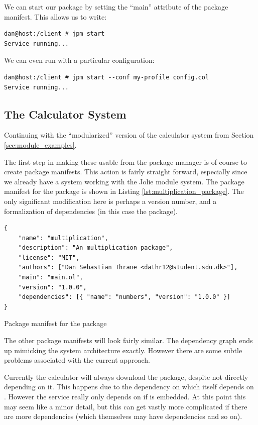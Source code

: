 We can start our package by setting the ``main'' attribute of the package
manifest. This allows us to write:

\begin{verbatim}
dan@host:/client # jpm start
Service running...
\end{verbatim}

We can even run with a particular configuration:

\begin{verbatim}
dan@host:/client # jpm start --conf my-profile config.col
Service running...
\end{verbatim}

\subsection{The Calculator System}
\label{sec:calculator_packages}

Continuing with the ``modularized'' version of the calculator system from
Section \ref{sec:module_examples}.

The first step in making these usable from the package manager is of course to
create package manifests. This action is fairly straight forward,
especially since we already have a system working with the Jolie module system.
The package manifest for the  package is shown in Listing
\ref{lst:multiplication_package}. The only significant modification here is
perhaps a version number, and a formalization of dependencies (in this case the
 package).

\begin{listing}[H]
\begin{verbatim}
{
    "name": "multiplication",
    "description": "An multiplication package",
    "license": "MIT",
    "authors": ["Dan Sebastian Thrane <dathr12@student.sdu.dk>"],
    "main": "main.ol",
    "version": "1.0.0",
    "dependencies": [{ "name": "numbers", "version": "1.0.0" }]
}
\end{verbatim}
\caption{Package manifest for the  package}
\label{lst:multiplication_package}
\end{listing}

The other package manifests will look fairly similar. The dependency graph ends
up mimicking the system architecture exactly. However there are some subtle
problems associated with the current approach.

Currently the calculator will always download the  package,
despite not directly depending on it. This happens due to the dependency on
 which itself depends on . However the
 service really only depends on  if
 is embedded. At this point this may seem like a minor
detail, but this can get vastly more complicated if there are more dependencies
(which themselves may have dependencies and so on).

